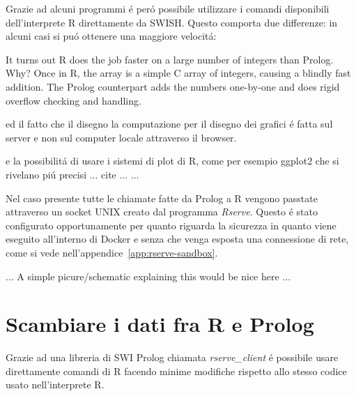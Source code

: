 \documentclass[10pt,titlepage,twoside,a4paper]{report}
\begin{document}
Grazie ad alcuni programmi \'e per\'o possibile utilizzare i comandi 
disponibili dell'interprete R direttamente da SWISH. Questo comporta due 
differenze: in alcuni casi si pu\'o ottenere una maggiore 
velocit\'a\cite{rFaster}:
\begin{displayquote}
[..] It turns out R does the job faster on a large number of integers
than Prolog.  Why?  Once in R, the array is a simple C array of integers,
causing a blindly fast addition.  The Prolog counterpart adds the numbers
one-by-one and does rigid overflow checking and handling.
\end{displayquote}
 
ed il 
fatto che il disegno 
la computazione per il disegno dei grafici \'e fatta sul server e non sul 
computer locale attraverso il browser.
 
e la possibilit\'a di usare i sistemi di plot di R, come per esempio ggplot2 
che si rivelano pi\'u precisi ... cite ... ...

Nel caso presente tutte le chiamate fatte da Prolog a R vengono passtate 
attraverso un socket UNIX creato dal programma \emph{Rserve}\cite{rserve}. 
Questo \'e stato configurato opportunamente per quanto riguarda la sicurezza 
in quanto viene eseguito all'interno di Docker e senza che venga esposta una 
connessione di rete, come si vede nell'appendice~\ref{app:rserve-sandbox}.

... A simple picure/schematic explaining this would be nice here ...

\section{Scambiare i dati fra R e Prolog}
Grazie ad una libreria di SWI Prolog chiamata 
\emph{rserve\_client}\cite{rserveclient} 
\'e possibile usare direttamente comandi di R facendo minime modifiche 
rispetto allo stesso codice usato nell'interprete R.
\end{document}

